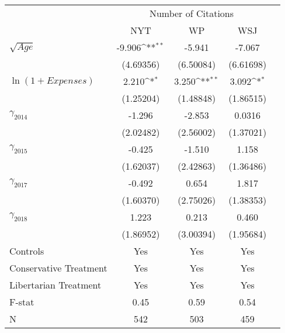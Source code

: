 \def\sym#1{\ifmmode^{#1}\else\(^{#1}\)\fi}
\setlength\tabcolsep{17pt}
\begin{tabular}{@{\extracolsep{7pt}}lcccc}
\toprule
                    &\multicolumn{3}{c}{Number of Citations}                          \\\cmidrule(lr){2-4}
                    &\multicolumn{1}{c}{NYT}         &\multicolumn{1}{c}{WP}         &\multicolumn{1}{c}{WSJ}         \\
\midrule
$\sqrt{Age}$        &      -9.906\sym{**} &      -5.941         &      -7.067         \\
                    &   (4.69356)         &   (6.50084)         &   (6.61698)         \\
\addlinespace
\small $\ln(1+Expenses)$&       2.210\sym{*}  &       3.250\sym{**} &       3.092\sym{*}  \\
                    &   (1.25204)         &   (1.48848)         &   (1.86515)         \\
\addlinespace
\large $\gamma_{2014}$&      -1.296         &      -2.853         &      0.0316         \\
                    &   (2.02482)         &   (2.56002)         &   (1.37021)         \\
\addlinespace
\large $\gamma_{2015}$&      -0.425         &      -1.510         &       1.158         \\
                    &   (1.62037)         &   (2.42863)         &   (1.36486)         \\
\addlinespace
\large $\gamma_{2017}$&      -0.492         &       0.654         &       1.817         \\
                    &   (1.60370)         &   (2.75026)         &   (1.38353)         \\
\addlinespace
\large $\gamma_{2018}$&       1.223         &       0.213         &       0.460         \\
                    &   (1.86952)         &   (3.00394)         &   (1.95684)         \\
\midrule
Controls            &         Yes         &         Yes         &         Yes         \\
Conservative Treatment&         Yes         &         Yes         &         Yes         \\
Libertarian Treatment&         Yes         &         Yes         &         Yes         \\
F-stat              &       0.45         &       0.59         &       0.54         \\
N                   &         542         &         503         &         459         \\
\bottomrule
\end{tabular}
